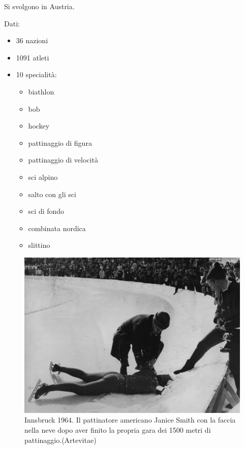 \documentclass[
]{book}
\providecommand{\tightlist}{%
  \setlength{\itemsep}{0pt}\setlength{\parskip}{0pt}}
\begin{document}
Si svolgono in Austria.

Dati:

\begin{itemize}
\tightlist
\item
  36 nazioni
\item
  1091 atleti
\item
  10 specialità:

  \begin{itemize}
  \tightlist
  \item
    biathlon
  \item
    bob
  \item
    hockey
  \item
    pattinaggio di figura
  \item
    pattinaggio di velocità
  \item
    sci alpino
  \item
    salto con gli sci
  \item
    sci di fondo
  \item
    combinata nordica
  \item
    slittino
  \end{itemize}
\end{itemize}

\begin{figure}
\includegraphics[width=0.8\linewidth]{images/ArteVitae/1964} \caption{Innsbruck 1964. Il pattinatore americano Janice Smith con la faccia nella neve dopo aver finito la propria gara dei 1500 metri di pattinaggio.(Artevitae)}\label{fig:unnamed-chunk-26}
\end{figure}
\end{document}
